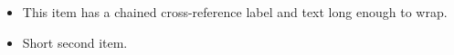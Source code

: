 \begin{itemize}
  \item \label{item:first} This item has
  a chained cross-reference label and
  text long enough to wrap.
  \item Short second item.
\end{itemize}
